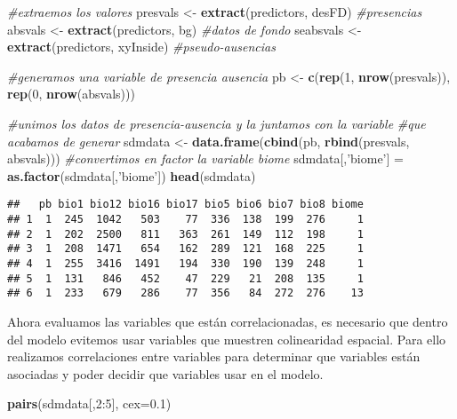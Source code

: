 \documentclass[]{article}
\newenvironment{Shaded}{\begin{snugshade}}{\end{snugshade}}
\newcommand{\KeywordTok}[1]{\textcolor[rgb]{0.13,0.29,0.53}{\textbf{{#1}}}}
\newcommand{\DataTypeTok}[1]{\textcolor[rgb]{0.13,0.29,0.53}{{#1}}}
\newcommand{\DecValTok}[1]{\textcolor[rgb]{0.00,0.00,0.81}{{#1}}}
\newcommand{\FloatTok}[1]{\textcolor[rgb]{0.00,0.00,0.81}{{#1}}}
\newcommand{\StringTok}[1]{\textcolor[rgb]{0.31,0.60,0.02}{{#1}}}
\newcommand{\CommentTok}[1]{\textcolor[rgb]{0.56,0.35,0.01}{\textit{{#1}}}}
\newcommand{\NormalTok}[1]{{#1}}
\begin{document}
\begin{Shaded}
\begin{Highlighting}[]
\CommentTok{#extraemos los valores}
\NormalTok{presvals <-}\StringTok{ }\KeywordTok{extract}\NormalTok{(predictors, desFD) }\CommentTok{#presencias}
\NormalTok{absvals <-}\StringTok{ }\KeywordTok{extract}\NormalTok{(predictors, bg) }\CommentTok{#datos de fondo}
\NormalTok{seabsvals <-}\StringTok{ }\KeywordTok{extract}\NormalTok{(predictors, xyInside) }\CommentTok{#pseudo-ausencias}

\CommentTok{#generamos una variable de presencia ausencia}
\NormalTok{pb <-}\StringTok{ }\KeywordTok{c}\NormalTok{(}\KeywordTok{rep}\NormalTok{(}\DecValTok{1}\NormalTok{, }\KeywordTok{nrow}\NormalTok{(presvals)), }\KeywordTok{rep}\NormalTok{(}\DecValTok{0}\NormalTok{, }\KeywordTok{nrow}\NormalTok{(absvals)))}

\CommentTok{#unimos los datos de presencia-ausencia y la juntamos con la variable}
\CommentTok{#que acabamos de generar}
\NormalTok{sdmdata <-}\StringTok{ }\KeywordTok{data.frame}\NormalTok{(}\KeywordTok{cbind}\NormalTok{(pb, }\KeywordTok{rbind}\NormalTok{(presvals, absvals)))}
\CommentTok{#convertimos en factor la variable biome}
\NormalTok{sdmdata[,}\StringTok{'biome'}\NormalTok{] =}\StringTok{ }\KeywordTok{as.factor}\NormalTok{(sdmdata[,}\StringTok{'biome'}\NormalTok{])}
\KeywordTok{head}\NormalTok{(sdmdata)}
\end{Highlighting}
\end{Shaded}

\begin{verbatim}
##   pb bio1 bio12 bio16 bio17 bio5 bio6 bio7 bio8 biome
## 1  1  245  1042   503    77  336  138  199  276     1
## 2  1  202  2500   811   363  261  149  112  198     1
## 3  1  208  1471   654   162  289  121  168  225     1
## 4  1  255  3416  1491   194  330  190  139  248     1
## 5  1  131   846   452    47  229   21  208  135     1
## 6  1  233   679   286    77  356   84  272  276    13
\end{verbatim}

Ahora evaluamos las variables que están correlacionadas, es necesario
que dentro del modelo evitemos usar variables que muestren colinearidad
espacial. Para ello realizamos correlaciones entre variables para
determinar que variables están asociadas y poder decidir que variables
usar en el modelo.

\begin{Shaded}
\begin{Highlighting}[]
\KeywordTok{pairs}\NormalTok{(sdmdata[,}\DecValTok{2}\NormalTok{:}\DecValTok{5}\NormalTok{], }\DataTypeTok{cex=}\FloatTok{0.1}\NormalTok{)}
\end{Highlighting}
\end{Shaded}
\end{document}
